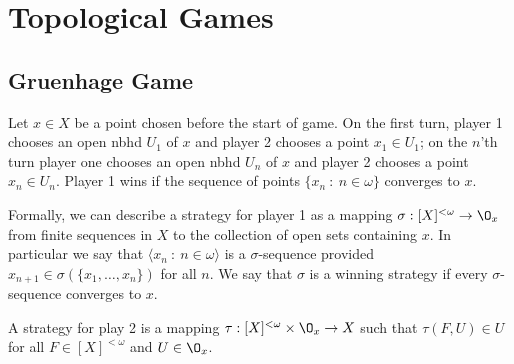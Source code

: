 \documentclass{article}
\begin{document}
\section{Topological Games}

\subsection{Gruenhage Game}

Let \(x \in X\) be a point chosen before the start of game. On the first turn, player 1 chooses an open nbhd \(U_1\) of \(x\) and player 2 chooses a point \(x_1 \in U_1\); on the \(n\)'th turn player one chooses an open nbhd \(U_n\) of \(x\) and player 2 chooses a point \(x_n \in U_n\). Player 1 wins if the sequence of points \(\{x_n \: : \: n \in \omega\}\) converges to \(x\).

Formally, we can describe a strategy for player 1 as a mapping \(\sigma: [X]^{<\omega} \to \O_x\) from finite sequences in \(X\) to the collection of open sets containing \(x\). In particular we say that \(\langle x_n \: : \: n \in \omega\rangle\) is a \(\sigma\)-sequence provided \(x_{n + 1} \in \sigma(\{x_1, \dots, x_n\})\) for all \(n\). We say that \(\sigma\) is a winning strategy if every \(\sigma\)-sequence converges to \(x\).

A strategy for play 2 is a mapping \(\tau: [X]^{<\omega} \times \O_x \to X\) such that \(\tau(F, U) \in U\) for all \(F \in [X]^{<\omega}\) and \(U \in \O_x\).
\end{document}
